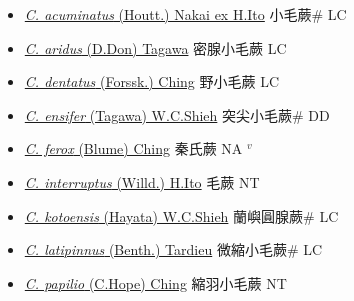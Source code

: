 \begin{itemize}
  \begin{itemize}
        \item[] \href{http://www.theplantlist.org/tpl1.1/search?q=Cyclosorus+acuminatus}{\textit{C. acuminatus} (Houtt.) Nakai ex H.Ito}   小毛蕨\# LC
        \item[] \href{http://www.theplantlist.org/tpl1.1/search?q=Cyclosorus+aridus}{\textit{C. aridus} (D.Don) Tagawa}   密腺小毛蕨 LC
        \item[] \href{http://www.theplantlist.org/tpl1.1/search?q=Cyclosorus+dentatus}{\textit{C. dentatus} (Forssk.) Ching}   野小毛蕨 LC
        \item[] \href{http://www.theplantlist.org/tpl1.1/search?q=Cyclosorus+ensifer}{\textit{C. ensifer} (Tagawa) W.C.Shieh}     突尖小毛蕨\# DD
        \item[] \href{http://www.theplantlist.org/tpl1.1/search?q=Cyclosorus+ferox}{\textit{C. ferox} (Blume) Ching}   秦氏蕨 NA $^v$
        \item[] \href{http://www.theplantlist.org/tpl1.1/search?q=Cyclosorus+interruptus}{\textit{C. interruptus} (Willd.) H.Ito}   毛蕨 NT
        \item[] \href{http://www.theplantlist.org/tpl1.1/search?q=Cyclosorus+kotoensis}{\textit{C. kotoensis} (Hayata) W.C.Shieh}   蘭嶼圓腺蕨\# LC
        \item[] \href{http://www.theplantlist.org/tpl1.1/search?q=Cyclosorus+latipinnus}{\textit{C. latipinnus} (Benth.) Tardieu}   微縮小毛蕨\# LC
        \item[] \href{http://www.theplantlist.org/tpl1.1/search?q=Cyclosorus+papilio}{\textit{C. papilio} (C.Hope) Ching}   縮羽小毛蕨 NT

\end{itemize}
\end{itemize}
